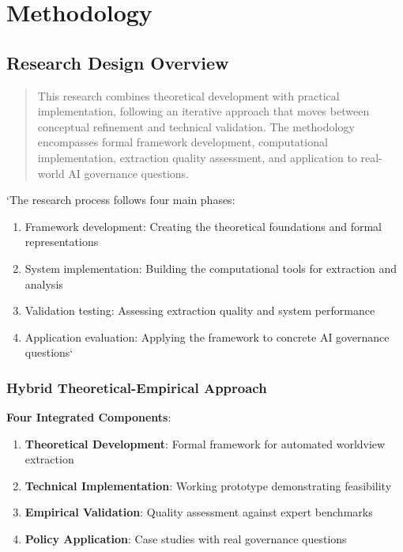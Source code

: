 \documentclass[
  11pt,
  letterpaper,
]{book}
\providecommand{\tightlist}{%
  \setlength{\itemsep}{0pt}\setlength{\parskip}{0pt}}
\begin{document}
\section{Methodology}\label{sec-methodology}

\subsection{Research Design Overview}\label{sec-research-design}

\begin{quote}
This research combines theoretical development with practical
implementation, following an iterative approach that moves between
conceptual refinement and technical validation. The methodology
encompasses formal framework development, computational implementation,
extraction quality assessment, and application to real-world AI
governance questions.
\end{quote}

`The research process follows four main phases:

\begin{enumerate}
\def\labelenumi{\arabic{enumi}.}
\tightlist
\item
  Framework development: Creating the theoretical foundations and formal
  representations
\item
  System implementation: Building the computational tools for extraction
  and analysis
\item
  Validation testing: Assessing extraction quality and system
  performance
\item
  Application evaluation: Applying the framework to concrete AI
  governance questions`
\end{enumerate}

\subsubsection{Hybrid Theoretical-Empirical
Approach}\label{sec-hybrid-approach}

\textbf{Four Integrated Components}:

\begin{enumerate}
\def\labelenumi{\arabic{enumi}.}
\tightlist
\item
  \textbf{Theoretical Development}: Formal framework for automated
  worldview extraction
\item
  \textbf{Technical Implementation}: Working prototype demonstrating
  feasibility
\item
  \textbf{Empirical Validation}: Quality assessment against expert
  benchmarks
\item
  \textbf{Policy Application}: Case studies with real governance
  questions
\end{enumerate}
\end{document}
